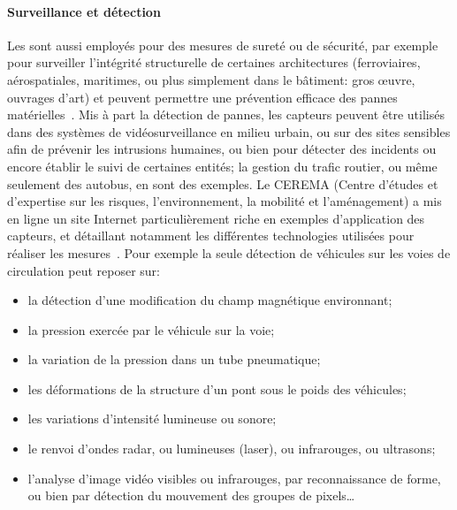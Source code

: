        \paragraph{Surveillance et détection}
Les \rcsfs sont aussi employés pour des mesures de sureté ou de sécurité, par exemple pour surveiller l'intégrité structurelle de certaines architectures (ferroviaires, aérospatiales, maritimes, ou plus simplement dans le bâtiment: gros œuvre, ouvrages d'art) et peuvent permettre une prévention efficace des pannes matérielles~\cite{SCOA13}.
Mis à part la détection de pannes, les capteurs peuvent être utilisés dans des systèmes de vidéosurveillance en milieu urbain, ou sur des sites sensibles afin de prévenir les intrusions humaines, ou bien pour détecter des incidents ou encore établir le suivi de certaines entités; la gestion du trafic routier, ou même seulement des autobus, en sont des exemples.
Le CEREMA (Centre d'études et d'expertise sur les risques, l'environnement, la mobilité et l'aménagement) a mis en ligne un site Internet particulièrement riche en exemples d'application des capteurs, et détaillant notamment les différentes technologies utilisées pour réaliser les mesures~\cite{sti}.
Pour exemple la seule détection de véhicules sur les voies de circulation peut reposer sur:
\begin{itemize}
    \item la détection d'une modification du champ magnétique environnant;
    \item la pression exercée par le véhicule sur la voie;
    \item la variation de la pression dans un tube pneumatique;
    \item les déformations de la structure d'un pont sous le poids des véhicules;
    \item les variations d'intensité lumineuse ou sonore;
    \item le renvoi d'ondes radar, ou lumineuses (laser), ou infrarouges, ou ultrasons;
    \item l'analyse d'image vidéo visibles ou infrarouges, par reconnaissance de forme, ou bien par détection du mouvement des groupes de pixels…
\end{itemize}

